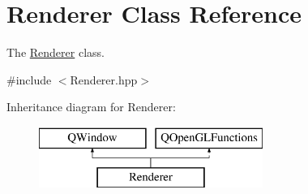 \hypertarget{classRenderer}{\section{Renderer Class Reference}
\label{classRenderer}
}


The \hyperlink{classRenderer}{Renderer} class.  




{\ttfamily \#include $<$Renderer.\+hpp$>$}

Inheritance diagram for Renderer\+:\begin{figure}[H]
\begin{center}
\leavevmode
\includegraphics[height=2.000000cm]{classRenderer}
\end{center}
\end{figure}

